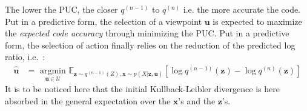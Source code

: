 \documentclass[12pt,twoside,openright]{article}
\begin{document}


The lower the PUC, the closer $q^{(n-1)}$ to $q^{(n)}$ i.e. the more accurate the  code. 
%
Put in a predictive form, the selection of a viewpoint $\boldsymbol{u}$ is expected to maximize the \emph{expected code accuracy} through minimizing the PUC.
Put in a predictive form, the selection of action finally relies on the reduction of the predicted log ratio, i.e.~:
\begin{align}
 \hat{\boldsymbol{u}} &= \underset{\boldsymbol{u} \in \mathcal{U}}{\text{ argmin }} \mathbb{E}_{\boldsymbol{z} \sim q^{(n-1)}(Z), \boldsymbol{x} \sim p(X|\boldsymbol{z}, \boldsymbol{u})}\left[\log q^{(n-1)}(\boldsymbol{z}) - \log q^{(n)}(\boldsymbol{z})\right]
\end{align}
It is to be noticed here that the initial Kullback-Leibler divergence is here absorbed in the general expectation over the $\boldsymbol{x}$'s and the $\boldsymbol{z}$'s.
\end{document}
